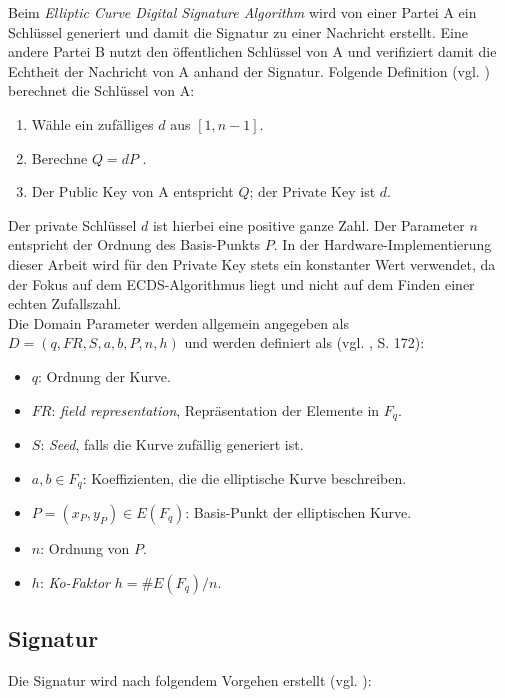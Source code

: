 Beim \textit{Elliptic Curve Digital Signature Algorithm} wird von einer Partei A ein Schlüssel generiert und damit die Signatur zu einer Nachricht erstellt. Eine andere Partei B nutzt den öffentlichen Schlüssel von A und verifiziert damit die Echtheit der Nachricht von A anhand der Signatur. Folgende Definition (vgl. \cite{hwimp}) berechnet die Schlüssel von A: \\

\begin{enumerate}
\item Wähle ein zufälliges $d$ aus $[1, n-1]$.
\item Berechne $Q = dP$ .
\item Der Public Key von A entspricht $Q$; der Private Key ist $d$. \\
\end{enumerate}

Der private Schlüssel $d$ ist hierbei eine positive ganze Zahl. Der Parameter $n$ entspricht der Ordnung des Basis-Punkts $P$. In der Hardware-Implementierung dieser Arbeit wird für den Private Key stets ein konstanter Wert verwendet, da der Fokus auf dem ECDS-Algorithmus liegt und nicht auf dem Finden einer echten Zufallszahl. \\

Die Domain Parameter werden allgemein angegeben als $D = (q,FR, S,a,b, P,n,h)$ und werden definiert als (vgl. \cite{guide}, S. 172):
\begin{itemize}
\item $q$: Ordnung der Kurve.
\item $FR$: \textit{field representation}, Repräsentation der Elemente in $F_q$.
\item $S$: \textit{Seed}, falls die Kurve zufällig generiert ist.
\item $a,b \in F_q$: Koeffizienten, die die elliptische Kurve beschreiben.
\item $P = (x_P,y_P) \in E(F_q)$: Basis-Punkt der elliptischen Kurve.
\item $n$: Ordnung von $P$.
\item $h$: \textit{Ko-Faktor} $h = \#E(F_q)/n$.
\end{itemize}

\subsection{Signatur}

Die Signatur wird nach folgendem Vorgehen erstellt (vgl. \cite{hwimp}):\\

